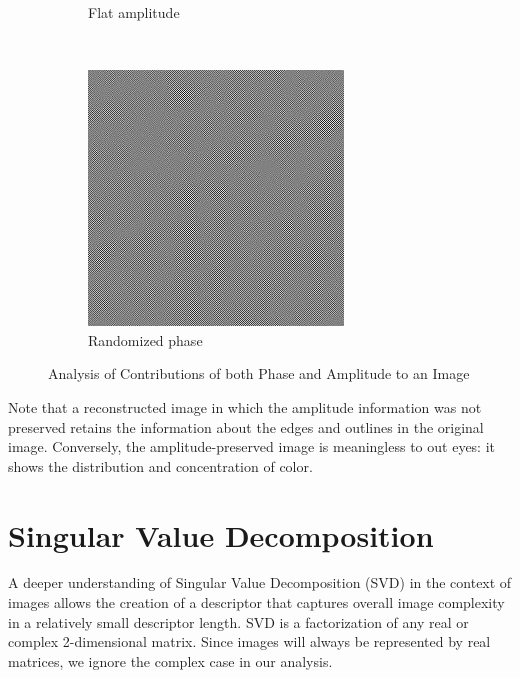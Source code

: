 \documentclass{report}
\begin{document}
\begin{figure}[H]
\begin{subfigure}[b]{0.2\textwidth}
                \caption{Flat amplitude}
                \label{fig:mouse}
        \end{subfigure}
        ~
        \begin{subfigure}[b]{0.2\textwidth}
                \includegraphics[width=\textwidth]{graphics/randomized_phase.jpg}
                \caption{Randomized phase}
                \label{fig:tiger}
        \end{subfigure}
        \caption{Analysis of Contributions of both Phase and Amplitude to an Image}\label{fig:fft_randomization}
\end{figure}
Note that a reconstructed image in which the amplitude information was not preserved retains the information about the edges and outlines in the original image. Conversely, the amplitude-preserved image is meaningless to out eyes: it shows the distribution and concentration of color. 




\section{Singular Value Decomposition}
\label{sec:SVD}
A deeper understanding of Singular Value Decomposition (SVD) in the context of images allows the creation of a descriptor that captures overall image complexity in a relatively small descriptor length. SVD is a factorization of any real or complex 2-dimensional matrix. Since images will always be represented by real matrices, we ignore the complex case in our analysis. 
\end{document}
